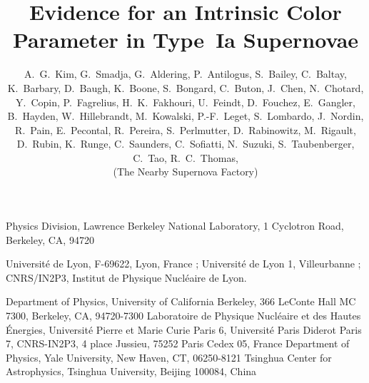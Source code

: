 \documentclass{aastex}   	%
\begin{document}
\title{Evidence for an Intrinsic Color Parameter in Type~Ia Supernovae}
\author
{
    A.~G.~Kim,
    G.~Smadja, 
    G.~Aldering,
    P.~Antilogus,
    S.~Bailey,
    C.~Baltay,
    K.~Barbary,
    D.~Baugh,
    K.~Boone,
    S.~Bongard,
    C.~Buton,
    J.~Chen,
    N.~Chotard,
    Y.~Copin,
    P.~Fagrelius,
    H.~K.~Fakhouri,
    U.~Feindt,
    D.~Fouchez,
    E.~Gangler,  
    B.~Hayden,
    W.~Hillebrandt,
    M.~Kowalski,
    P.-F.~Leget,
    S.~Lombardo,
    J.~Nordin,
    R.~Pain, 
    E.~Pecontal,
    R.~Pereira,
    S.~Perlmutter,
    D.~Rabinowitz,
    M.~Rigault, 
    D.~Rubin,
    K.~Runge,
    C.~Saunders,
    C.~Sofiatti, 
    N.~Suzuki,
    S.~Taubenberger,
    C.~Tao,
    R.~C.~Thomas, \\
    (The Nearby Supernova Factory)
}


{
    Physics Division, Lawrence Berkeley National Laboratory, 
    1 Cyclotron Road, Berkeley, CA, 94720
}

{
    Universit\'e de Lyon, F-69622, Lyon, France ; Universit\'e de Lyon 1, Villeurbanne ; 
    CNRS/IN2P3, Institut de Physique Nucl\'eaire de Lyon.
}

{
    Department of Physics, University of California Berkeley,
    366 LeConte Hall MC 7300, Berkeley, CA, 94720-7300
}
{
    Laboratoire de Physique Nucl\'eaire et des Hautes \'Energies,
    Universit\'e Pierre et Marie Curie Paris 6, Universit\'e Paris Diderot Paris 7, CNRS-IN2P3, 
    4 place Jussieu, 75252 Paris Cedex 05, France
}
{
    Department of Physics, Yale University, 
    New Haven, CT, 06250-8121
}
{
    Tsinghua Center for Astrophysics, Tsinghua University, Beijing 100084, China 
}
\end{document}
